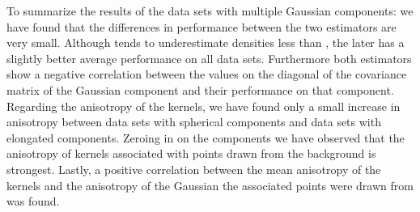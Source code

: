 	To summarize the results of the data sets with multiple Gaussian components: we have found that the differences in performance between the two estimators are very small. Although \sambe tends to underestimate densities less than \mbe, the later has a slightly better average performance on all data sets.
	Furthermore both estimators show a negative correlation between the values on the diagonal of the covariance matrix of the Gaussian component and their performance on that component.
	Regarding the anisotropy of the kernels, we have found only a small increase in anisotropy between data sets with spherical components and data sets with elongated components.
	Zeroing in on the components we have observed that the anisotropy of kernels associated with points drawn from the background is strongest.
	Lastly, a positive correlation between the mean anisotropy of the kernels and the anisotropy of the Gaussian the associated points were drawn from was found.